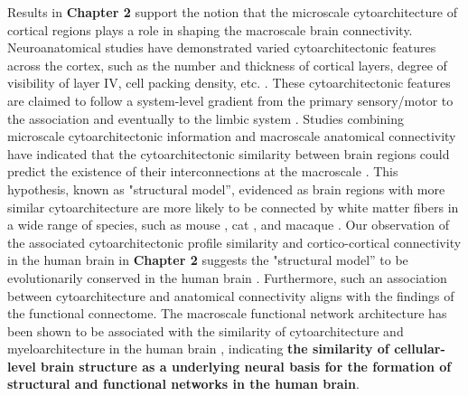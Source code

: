 \begin{refsection}
Results in \textbf{Chapter 2} support the notion that the microscale cytoarchitecture of cortical regions plays a role in shaping the macroscale brain connectivity. Neuroanatomical studies have demonstrated varied cytoarchitectonic features across the cortex, such as the number and thickness of cortical layers, degree of visibility of layer IV, cell packing density, etc. \citep{brodmann1909vergleichende, von1925cytoarchitektonik,Uluda2015fMRIFN}. These cytoarchitectonic features are claimed to follow a system-level gradient from the primary sensory/motor to the association and eventually to the limbic system \citep{Uluda2015fMRIFN,Paquola2019MicrostructuralAF}. Studies combining microscale cytoarchitectonic information and macroscale anatomical connectivity have indicated that the cytoarchitectonic similarity between brain regions could predict the existence of their interconnections at the macroscale \citep{barbas2015general,GarcaCabezas2019TheSM}. This hypothesis, known as "structural model”, evidenced as brain regions with more similar cytoarchitecture are more likely to be connected by white matter fibers in a wide range of species, such as mouse \citep{goulas2017principles}, cat \citep{beul2015predictive}, and macaque \citep{Hilgetag2010CytoarchitecturalDA,beul2017predictive}. Our observation of the associated cytoarchitectonic profile similarity and cortico-cortical connectivity in the human brain in \textbf{Chapter 2} suggests the "structural model” to be evolutionarily conserved in the human brain \citep{WEI2019bigbrain}. Furthermore, such an association between cytoarchitecture and anatomical connectivity aligns with the findings of the functional connectome. The macroscale functional network architecture has been shown to be associated with the similarity of cytoarchitecture and myeloarchitecture in the human brain \citep{Paquola2019MicrostructuralAF,Hunt2016RelationshipsBC,Huntenburg2017ASR}, indicating \textbf{the similarity of cellular-level brain structure as a underlying neural basis for the formation of structural and functional networks in the human brain}.


\end{refsection}
